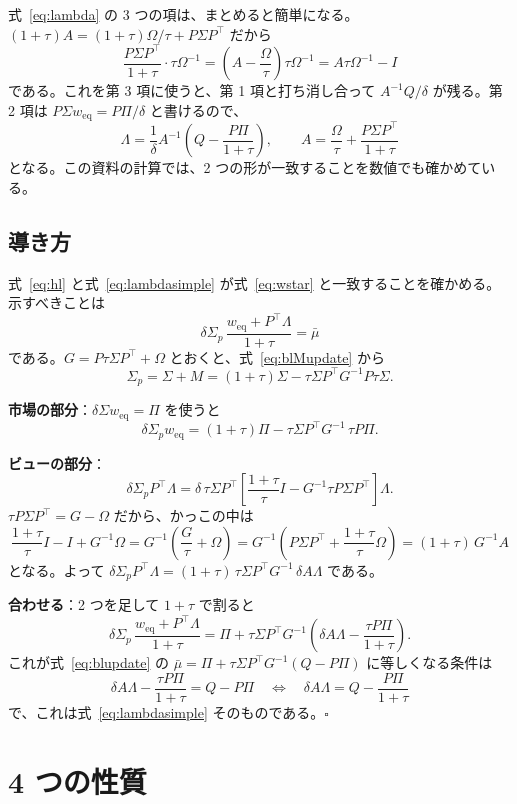 \documentclass[xelatex,ja=standard,jafont=hiragino-pron,a4paper,11pt,openany]{bxjsreport}
\newcommand{\T}{^{\top}}
\newcommand{\weq}{w_{\mathrm{eq}}}
\newcommand{\mub}{\bar{\mu}}
\newcommand{\Sp}{\Sigma_{p}}
\begin{document}
式~\eqref{eq:lambda} の 3 つの項は、まとめると簡単になる。$(1 + \tau)A = (1 + \tau)\Omega/\tau + P\Sigma P\T$ だから
\[
\frac{P\Sigma P\T}{1 + \tau}\cdot\tau\Omega^{-1} = \left(A - \frac{\Omega}{\tau}\right)\tau\Omega^{-1} = A\tau\Omega^{-1} - I
\]
である。これを第 3 項に使うと、第 1 項と打ち消し合って $A^{-1}Q/\delta$ が残る。第 2 項は $P\Sigma\weq = P\Pi/\delta$ と書けるので、
\begin{equation}
\Lambda = \frac{1}{\delta}A^{-1}\left(Q - \frac{P\Pi}{1 + \tau}\right),\qquad
A = \frac{\Omega}{\tau} + \frac{P\Sigma P\T}{1 + \tau}
\label{eq:lambdasimple}
\end{equation}
となる。この資料の計算では、2 つの形が一致することを数値でも確かめている。

\subsection{導き方}

式~\eqref{eq:hl} と式~\eqref{eq:lambdasimple} が式~\eqref{eq:wstar} と一致することを確かめる。示すべきことは
\[
\delta\Sp\,\frac{\weq + P\T\Lambda}{1 + \tau} = \mub
\]
である。$G = P\tau\Sigma P\T + \Omega$ とおくと、式~\eqref{eq:blMupdate} から
\[
\Sp = \Sigma + M = (1 + \tau)\Sigma - \tau\Sigma P\T G^{-1}P\tau\Sigma .
\]

\textbf{市場の部分}：$\delta\Sigma\weq = \Pi$ を使うと
\[
\delta\Sp\weq = (1 + \tau)\Pi - \tau\Sigma P\T G^{-1}\,\tau P\Pi .
\]

\textbf{ビューの部分}：
\[
\delta\Sp P\T\Lambda = \delta\,\tau\Sigma P\T\left[\frac{1 + \tau}{\tau}I - G^{-1}\tau P\Sigma P\T\right]\Lambda .
\]
$\tau P\Sigma P\T = G - \Omega$ だから、かっこの中は
\[
\frac{1 + \tau}{\tau}I - I + G^{-1}\Omega = G^{-1}\left(\frac{G}{\tau} + \Omega\right)
= G^{-1}\left(P\Sigma P\T + \frac{1 + \tau}{\tau}\Omega\right) = (1 + \tau)\,G^{-1}A
\]
となる。よって $\delta\Sp P\T\Lambda = (1 + \tau)\,\tau\Sigma P\T G^{-1}\,\delta A\Lambda$ である。

\textbf{合わせる}：2 つを足して $1 + \tau$ で割ると
\[
\delta\Sp\,\frac{\weq + P\T\Lambda}{1 + \tau}
= \Pi + \tau\Sigma P\T G^{-1}\left(\delta A\Lambda - \frac{\tau P\Pi}{1 + \tau}\right).
\]
これが式~\eqref{eq:blupdate} の $\mub = \Pi + \tau\Sigma P\T G^{-1}(Q - P\Pi)$ に等しくなる条件は
\[
\delta A\Lambda - \frac{\tau P\Pi}{1 + \tau} = Q - P\Pi
\quad\Longleftrightarrow\quad
\delta A\Lambda = Q - \frac{P\Pi}{1 + \tau}
\]
で、これは式~\eqref{eq:lambdasimple} そのものである。\hfill$\square$

\section{4 つの性質}
\end{document}
